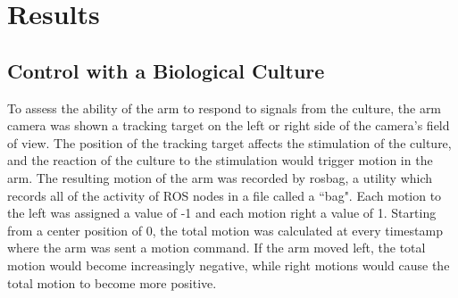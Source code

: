 \documentclass[letterpaper]{article}
\begin{document}
\section{Results}

\subsection{Control with a Biological Culture} 

To assess the ability of the arm to respond to signals from the culture, the arm camera was shown a tracking target on the left or right side of the camera's field of view.
The position of the tracking target affects the stimulation of the culture, and the reaction of the culture to the stimulation would trigger motion in the arm. 
The resulting motion of the arm was recorded by rosbag, a utility which records all of the activity of ROS nodes in a file called a ``bag". 
Each motion to the left was assigned a value of -1 and each motion right a value of 1. 
Starting from a center position of 0, the total motion was calculated at every timestamp where the arm was sent a motion command. 
If the arm moved left, the total motion would become increasingly negative, while right motions would cause the total motion to become more positive. 
\end{document}
